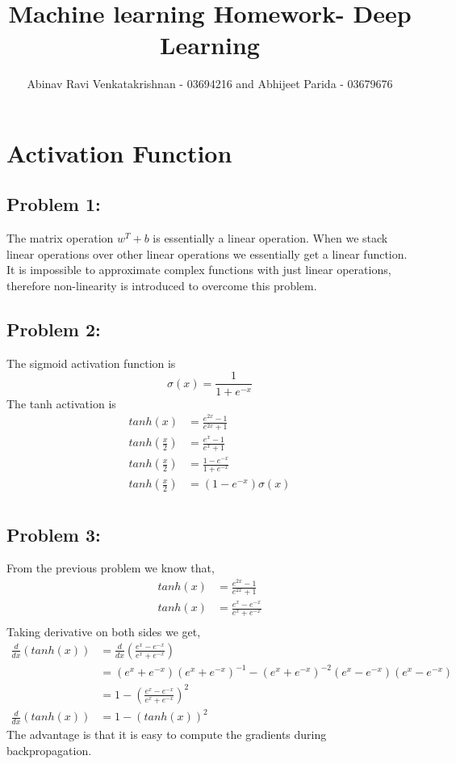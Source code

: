 \documentclass[5pt,a4paper]{article}
\begin{document}
	\title{Machine learning Homework- Deep Learning }
	\author{Abinav Ravi Venkatakrishnan - 03694216 and Abhijeet Parida - 03679676}
	\maketitle
	\section{Activation Function}
	\subsection*{Problem 1:}
	The matrix operation $w^T+b$ is essentially a linear operation. When we stack linear operations over other linear operations we essentially get a linear function. It is impossible to approximate complex functions with just linear operations, therefore non-linearity is introduced to overcome this problem.
	
	\subsection*{Problem 2:}
	The sigmoid activation function is \\
	\begin{equation*}
	\sigma(x)=\frac{1}{1+e^{-x}}
	\end{equation*}
	The tanh activation is\\
	\begin{eqnarray*}
	tanh(x)&=\frac{e^{2x}-1}{e^{2x}+1}\\
	tanh(\frac{x}{2})&=\frac{e^{x}-1}{e^{x}+1}\\
	tanh(\frac{x}{2})&=\frac{1-e^{-x}}{1+e^{-x}}\\
	tanh(\frac{x}{2})&=(1-e^{-x})\sigma(x)\\
	\end{eqnarray*}
	
	\subsection*{Problem 3:}
	From the previous problem we know that,
	\begin{eqnarray*}
		tanh(x)&=\frac{e^{2x}-1}{e^{2x}+1}\\
		tanh(x)&=\frac{e^{x}-e^{-x}}{e^{x}+e^{-x}}\\
	\end{eqnarray*}
	Taking derivative on both sides we get,
	\begin{eqnarray*}
		\frac{d}{dx}(tanh(x))&=\frac{d}{dx}(\frac{e^{x}-e^{-x}}{e^{x}+e^{-x}})\\
		&=(e^{x}+e^{-x})(e^{x}+e^{-x})^{-1}-(e^{x}+e^{-x})^{-2}(e^{x}-e^{-x})(e^{x}-e^{-x})\\
		&= 1- (\frac{e^{x}-e^{-x}}{e^{x}+e^{-x}})^2\\
		\frac{d}{dx}(tanh(x))&=1-(tanh(x))^2
	\end{eqnarray*}
	The advantage is that it is easy to compute the gradients during backpropagation.
\end{document}

